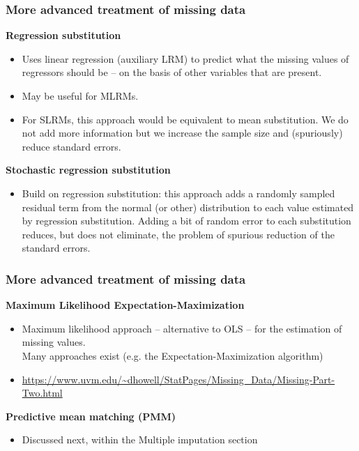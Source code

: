 \documentclass{beamer}
\begin{document}
\begin{frame}
\frametitle{More advanced treatment of missing data}
\textbf{Regression substitution}
  \begin{itemize}
  \item Uses linear regression (auxiliary LRM) to predict what the missing values of regressors should be -- on the basis of other variables that are present.
  \item May be useful for MLRMs.
  \item For SLRMs, this approach would be equivalent to mean substitution. We do not add more information but we increase the sample size and (spuriously) reduce standard errors.

   \end{itemize}
  \vspace{0.2cm}
\textbf{Stochastic regression substitution}
  \begin{itemize}
  \item Build on regression substitution: this approach adds a randomly sampled residual term from the normal (or other) distribution to each value estimated by regression substitution. Adding a bit of random error to each substitution reduces, but does not eliminate, the problem of spurious reduction of the standard errors.
   \end{itemize}
\end{frame}
\begin{frame}
\frametitle{More advanced treatment of missing data}

\textbf{Maximum Likelihood Expectation-Maximization}\\
\bigskip
  \begin{itemize}
  \item Maximum likelihood approach -- alternative to OLS -- for the estimation of missing values. \\ \medskip 
  Many approaches exist (e.g. the Expectation-Maximization algorithm)
  \item[] \scriptsize{\url{https://www.uvm.edu/~dhowell/StatPages/Missing_Data/Missing-Part-Two.html}}
   \end{itemize}
\bigskip   
 \textbf{Predictive mean matching (PMM)}\\
\begin{itemize}
     \item Discussed next, within the Multiple imputation section
 \end{itemize}

\end{frame}
\end{document}
